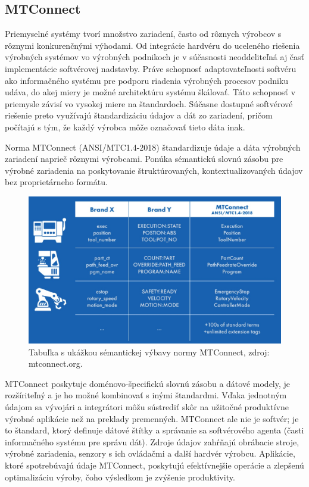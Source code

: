 \documentclass[]{tukediphc}
\begin{document}
\newpage

\subsection{MTConnect}

Priemyselné systémy tvorí množstvo zariadení, často od rôznych výrobcov s rôznymi konkurenčnými výhodami. Od integrácie hardvéru do uceleného riešenia výrobných systémov vo výrobných podnikoch je v súčasnosti neoddeliteľná aj časť implementácie softvérovej nadstavby. Práve schopnosť adaptovateľnosti softvéru ako informačného systému pre podporu riadenia výrobných procesov podniku udáva, do akej miery je možné architektúru systému škálovať. Táto schopnosť v priemysle závisí vo vysokej miere na štandardoch. Súčasne dostupné softvérové riešenie preto využívajú štandardizáciu údajov a dát zo zariadení, pričom počítajú s tým, že každý výrobca môže označovať tieto dáta inak.

Norma MTConnect (ANSI/MTC1.4-2018) štandardizuje údaje a dáta výrobných zariadení naprieč rôznymi výrobcami. Ponúka sémantickú slovnú zásobu pre výrobné zariadenia na poskytovanie štruktúrovaných, kontextualizovaných údajov bez proprietárneho formátu.

\begin{figure}[h!]
	\centering
	\includegraphics[width=.8\textwidth,angle=0]{figures/mtconnect.jpg}
	\caption{Tabuľka s ukážkou sémantickej výbavy normy MTConnect, zdroj: mtconnect.org.}
\end{figure}

MTConnect poskytuje doménovo-špecifickú slovnú zásobu a dátové modely, je rozšíriteľný a je ho možné kombinovať s inými štandardmi. Vďaka jednotným údajom sa vývojári a integrátori môžu sústrediť skôr na užitočné produktívne výrobné aplikácie než na preklady premenných. MTConnect ale nie je softvér; je to štandard, ktorý definuje dátové štítky a správanie sa softvérového agenta (časti informačného systému pre správu dát). Zdroje údajov zahŕňajú obrábacie stroje, výrobné zariadenia, senzory s ich ovládačmi a ďalší hardvér výrobcu. Aplikácie, ktoré spotrebúvajú údaje MTConnect, poskytujú efektívnejšie operácie a zlepšenú optimalizáciu výroby, čoho výsledkom je zvýšenie produktivity.
\end{document}
